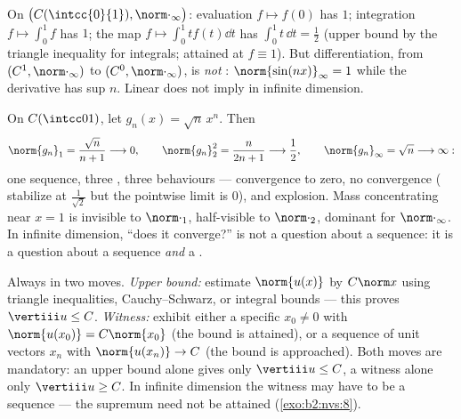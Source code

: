 \begin{example}\label{ex:b2:nvs:operatornorms}
On $\bigl(C(\intcc{0}{1}), \norm\cdot_\infty\bigr)$: evaluation
$f \mapsto f(0)$ has  $1$; integration $f \mapsto
\int_0^1 f$ has  $1$; the map $f \mapsto \int_0^1 t f(t)\dd t$
has  $\int_0^1 t\,\dd t = \frac12$ (upper bound by the triangle
inequality for integrals; attained at $f \equiv 1$). But
differentiation, from $(C^1, \norm\cdot_\infty)$ to $(C^0,
\norm\cdot_\infty)$, is \emph{not} : $\norm{\sin(nx)}_\infty
= 1$ while the derivative has sup  $n$. Linear does not imply
 in infinite dimension.
\end{example}

\begin{example}\label{ex:b2:nvs:sqrtnxn}
On $C(\intcc01)$, let $g_n(x) = \sqrt{n}\,x^n$. Then
\[
\norm{g_n}_1 = \frac{\sqrt n}{n + 1} \longrightarrow 0,
\qquad
\norm{g_n}_2^2 = \frac{n}{2n + 1} \longrightarrow \frac12,
\qquad
\norm{g_n}_\infty = \sqrt n \longrightarrow \infty :
\]
one sequence, three , three behaviours --- convergence to
zero, no convergence ( stabilize at $\frac1{\sqrt2}$ but
the pointwise limit is $0$), and explosion. Mass concentrating
near $x = 1$ is invisible to $\norm\cdot_1$, half-visible to
$\norm\cdot_2$, dominant for $\norm\cdot_\infty$. In infinite
dimension, ``does it converge?'' is not a question about a
sequence: it is a question about a sequence \emph{and} a .
\end{example}

\begin{method}\label{met:b2:nvs:opnorm}
Always in two moves. \emph{Upper bound:} estimate
$\norm{u(x)}$ by $C\norm x$ using triangle inequalities,
Cauchy--Schwarz, or integral bounds --- this proves $\vertiii u
\leq C$. \emph{Witness:} exhibit either a specific $x_0 \neq 0$
with $\norm{u(x_0)} = C\norm{x_0}$ (the bound is attained), or a
sequence of unit vectors $x_n$ with $\norm{u(x_n)} \to C$ (the
bound is approached). Both moves are mandatory: an upper bound
alone gives only $\vertiii u \leq C$, a witness alone only
$\vertiii u \geq C$. In infinite dimension the witness may have
to be a sequence --- the supremum need not be attained
(\cref{exo:b2:nvs:8}).
\end{method}

